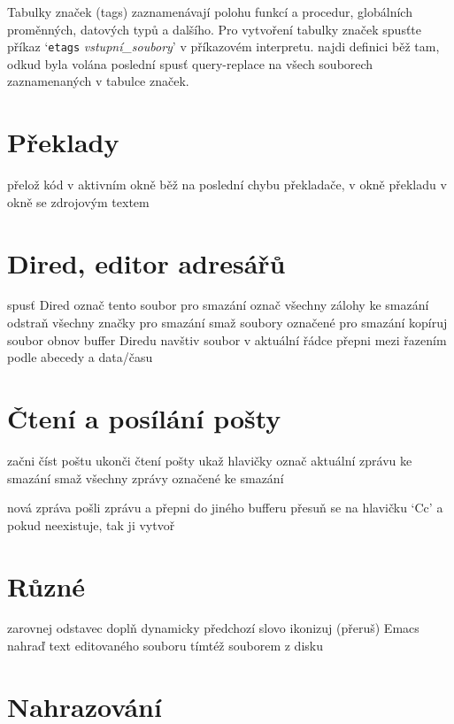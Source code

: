 Tabulky značek (tags) zaznamenávají polohu funkcí a procedur, globálních
proměnných, datových typů a dalšího. Pro vytvoření tabulky značek spusťte
příkaz `{\tt etags} {\it vstupní\_soubory}' v příkazovém interpretu.
\askip
{} najdi definici
 běž tam, odkud byla volána poslední 
 spusť query-replace na všech souborech
zaznamenaných v tabulce značek.

\section{Překlady}

 přelož kód v aktivním okně
 běž na poslední chybu překladače, v okně překladu
 v okně se zdrojovým textem

\section{Dired, editor adresářů}

 spusť Dired
 označ tento soubor pro smazání
\key{\~{}} označ všechny zálohy ke smazání
 odstraň všechny značky pro smazání
 smaž soubory označené pro smazání
 kopíruj soubor
 obnov buffer Diredu
 navštiv soubor v aktuální řádce
 přepni mezi řazením podle abecedy a data/času

\section{Čtení a posílání pošty}

 začni číst poštu
 ukonči čtení pošty
 ukaž hlavičky
 označ aktuální zprávu ke smazání
 smaž všechny zprávy označené ke smazání

 nová zpráva
 pošli zprávu a přepni do jiného bufferu
 přesuň se na hlavičku `Cc' a pokud neexistuje, tak ji
vytvoř

\section{Různé}

 zarovnej odstavec
 doplň dynamicky předchozí slovo
 ikonizuj (přeruš) Emacs
 nahraď text editovaného souboru tímtéž souborem z disku

\section{Nahrazování}

